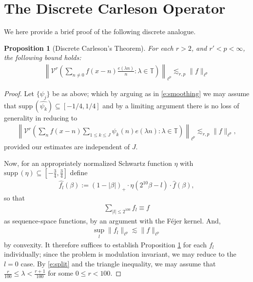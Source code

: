 \documentclass[12pt]{amsart}
\def\supp {{\mathrm{supp}\,}}
\numberwithin{equation}{section}
\newtheorem{proposition}[theorem]{Proposition}
\theoremstyle{definition}
\begin{document}
\section{The Discrete Carleson Operator}\label{a:disc}
We here provide a brief proof of the following discrete analogue.
\begin{proposition}[Discrete Carleson's Theorem]\label{p:disc}
For each $r > 2$, and $r' < p < \infty$, the following bound holds:
    \begin{align}
     \left   \| \mathcal{V}^r\left( \sum_{n \neq 0 } f(x-n) \frac{e(\lambda n)}{n} : \lambda \in \mathbb{T} \right) \right\|_{\ell^p} \lesssim_{r,p}  \| f\|_{\ell^p}
    \end{align}
\end{proposition}
\begin{proof}
 Let $\{ \psi_j \}$ be as above; which by arguing as in \eqref{e:smoothing} we may assume that  $\supp(\widehat{\psi_k})\subseteq[-1/4,1/4]$ and by a limiting argument  there is no loss of generality in reducing to
    \begin{align}
    \left    \| \mathcal{V}^r \left( \sum_n  f(x-n) \sum_{1 \leq k \leq J} \psi_k(n) e(\lambda n) : \lambda \in \mathbb{T} \right) \right\|_{\ell^p} \lesssim_{r,p}  \| f\|_{\ell^p},
    \end{align}
provided our estimates are independent of $J$. 

Now, for an appropriately normalized Schwartz function $\eta$  with $\supp(\eta) \subseteq \left[-\frac{3}{4},\frac{3}{4}\right]$ define
\begin{align}
    \widehat{f_l}(\beta) := (1 - |\beta|)_+ \cdot \eta(2^{10} \beta -l) \cdot \widehat{f}(\beta),
\end{align}
so that
\begin{align}
    \sum_{|l| \leq 2^{100}} f_l \equiv f
\end{align}
as sequence-space functions, by an argument with the F\'{e}jer kernel. And,
\begin{align}
    \sup_l \| f_l \|_{\ell^p} \lesssim \| f \|_{\ell^p}
\end{align}
by convexity. It therefore suffices to establish Proposition \ref{p:disc} for each $f_l$ individually; since the problem is modulation invariant, we may reduce to the $l=0$ case. By \eqref{e:split} and the triangle inequality, we may assume that $\frac{r}{100} \leq \lambda < \frac{r+1}{100}$ for some $0 \leq r < 100$.


\end{proof}
\end{document}
